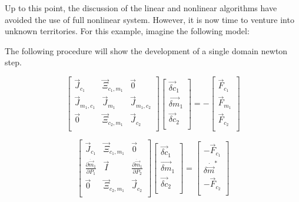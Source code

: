 Up to this point, the discussion of the linear and nonlinear algorithms have avoided the use of full nonlinear system.
However, it is now time to venture into unknown territories.
For this example, imagine the following model:


The following procedure will show the development of a single domain newton step.

\begin{equation}
\label{eqn:domainMatrix}
 \begin{bmatrix} 
\vec{J}_{c_1} & \vec{\Xi}_{c_1,m_1} & \vec{0} \\
\vec{J}_{m_1,c_1} & \vec{J}_{m_1} & \vec{J}_{m_1,c_2}  \\
\vec{0} & \vec{\Xi}_{c_2,m_1} & \vec{J}_{c_2} \\
 \end{bmatrix} \begin{bmatrix}
 \vec{\delta c}_{1} \\
 \vec{\delta m}_{1} \\
 \vec{\delta c}_{2} \\
\end{bmatrix}  = -\begin{bmatrix}
 \vec{F}_{c_1} \\
 \vec{F}_{m_1} \\
 \vec{F}_{c_2} \\
\end{bmatrix}
 \end{equation}
 
 \begin{equation}
\label{eqn:domainMatrix2}
 \begin{bmatrix} 
\vec{J}_{c_1} & \vec{\Xi}_{c_1,m_1} & \vec{0} \\
\frac{\partial \dot{\vec{m}}_{1}}{\partial P_{1} } & \vec{I} & \frac{\partial \dot{\vec{m}}_{1}}{\partial P_{2} }  \\
\vec{0} & \vec{\Xi}_{c_2,m_1} & \vec{J}_{c_2} \\
 \end{bmatrix} \begin{bmatrix}
 \vec{\delta c}_{1} \\
 \vec{\delta m}_{1} \\
 \vec{\delta c}_{2} \\
\end{bmatrix}  = \begin{bmatrix}
 - \vec{F}_{c_1} \\
 \delta \dot{\vec{m}}^{*} \\
 - \vec{F}_{c_2} \\
\end{bmatrix}
 \end{equation}
 
